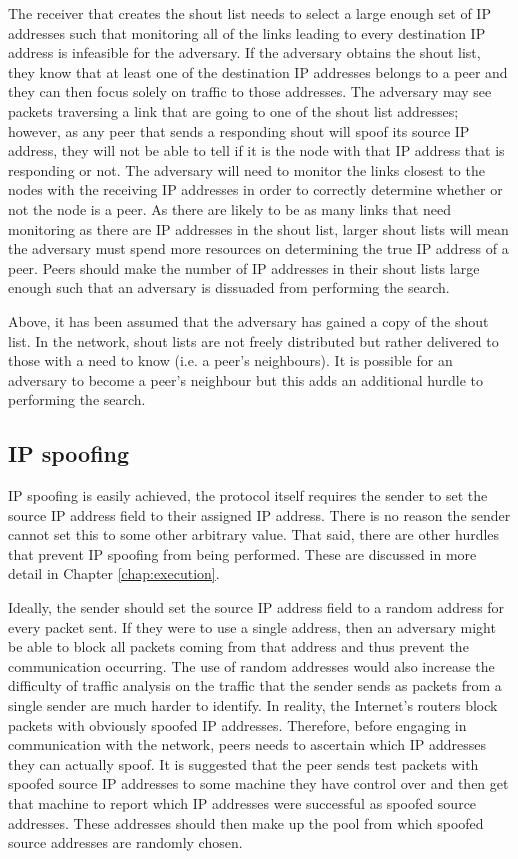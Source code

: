 \documentclass[ %
                    author={Luke Murray},
                supervisor={Dr. Simon Hollis},
                     title={Shadow Peer-to-Peer Networks},
                  subtitle={},
                    degree={MEng},
                      year={2013} ]{thesis}
\begin{document}
The receiver that creates the shout list needs to select a large enough set of IP addresses such that monitoring all of the links leading to every destination IP address is infeasible for the adversary. If the adversary obtains the shout list, they know that at least one of the destination IP addresses belongs to a peer and they can then focus solely on traffic to those addresses. The adversary may see packets traversing a link that are going to one of the shout list addresses; however, as any peer that sends a responding shout will spoof its source IP address, they will not be able to tell if it is the node with that IP address that is responding or not. The adversary will need to monitor the links closest to the nodes with the receiving IP addresses in order to correctly determine whether or not the node is a peer. As there are likely to be as many links that need monitoring as there are IP addresses in the shout list, larger shout lists will mean the adversary must spend more resources on determining the true IP address of a peer. Peers should make the number of IP addresses in their shout lists large enough such that an adversary is dissuaded from performing the search.

Above, it has been assumed that the adversary has gained a copy of the shout list. In the network, shout lists are not freely distributed but rather delivered to those with a need to know (i.e. a peer's neighbours). It is possible for an adversary to become a peer's neighbour but this adds an additional hurdle to performing the search.

\subsection{IP spoofing}

IP spoofing is easily achieved, the protocol itself requires the sender to set the source IP address field to their assigned IP address. There is no reason the sender cannot set this to some other arbitrary value. That said, there are other hurdles that prevent IP spoofing from being performed. These are discussed in more detail in Chapter \ref{chap:execution}.

Ideally, the sender should set the source IP address field to a random address for every packet sent. If they were to use a single address, then an adversary might be able to block all packets coming from that address and thus prevent the communication occurring. The use of random addresses would also increase the difficulty of traffic analysis on the traffic that the sender sends as packets from a single sender are much harder to identify. In reality, the Internet's routers block packets with obviously spoofed IP addresses. Therefore, before engaging in communication with the network, peers needs to ascertain which IP addresses they can actually spoof. It is suggested that the peer sends test packets with spoofed source IP addresses to some machine they have control over and then get that machine to report which IP addresses were successful as spoofed source addresses. These addresses should then make up the pool from which spoofed source addresses are randomly chosen.
\end{document}
